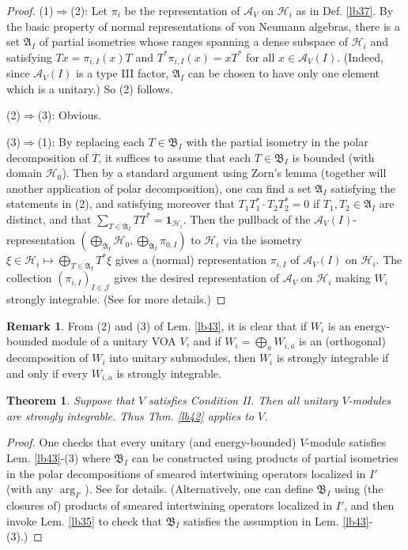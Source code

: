 \documentclass[11pt,b5paper,notitlepage]{article}
\theoremstyle{definition}
\newtheorem{rem}[df]{Remark}
\theoremstyle{plain}
\newtheorem{thm}[df]{Theorem}
\newcommand{\fk}{\mathfrak}
\newcommand{\mc}{\mathcal}
\newcommand{\ovl}{\overline}
\newcommand{\idt}{\mathbf{1}}
\numberwithin{equation}{section}
\begin{document}
\begin{proof}
(1)$\Rightarrow$(2): Let $\pi_i$ be the representation of $\mc A_V$ on $\mc H_i$ as in Def. \ref{lb37}. By the basic property of normal representations of von Neumann algebras, there is a set $\fk A_I$ of partial isometries whose ranges spanning a dense subspace of $\mc H_i$ and satisfying $Tx=\pi_{i,I}(x)T$ and $T^*\pi_{i,I}(x)=xT^*$ for all $x\in\mc A_V(I)$. (Indeed, since $\mc A_V(I)$ is a type III factor, $\fk A_I$ can be chosen to have only one element which is a unitary.) So (2) follows.

(2)$\Rightarrow$(3): Obvious.

(3)$\Rightarrow$(1): By replacing each $T\in\fk B_I$ with the partial isometry in the polar decomposition of $\ovl T$, it suffices to assume that each $T\in\fk B_I$ is bounded (with domain $\mc H_0$). Then by a standard argument using Zorn's lemma (together will another application of polar decomposition), one can find a set $\fk A_I$ satisfying the statements in (2), and satisfying moreover that $T_1T_1^*\cdot T_2T_2^*=0$ if $T_1,T_2\in\fk A_I$ are distinct, and that $\sum_{T\in\fk A_I}TT^*=\idt_{\mc H_i}$. Then the pullback of the $\mc A_V(I)$-representation $(\bigoplus_{\fk A_I}\mc H_0,\bigoplus_{\fk A_I}\pi_{0,I})$ to $\mc H_i$  via the isometry $\xi\in\mc H_i\mapsto \bigoplus_{T\in\fk A_I}T^*\xi$ gives a (normal) representation $\pi_{i,I}$ of $\mc A_V(I)$ on $\mc H_i$. The collection $(\pi_{i,I})_{I\in\mc J}$ gives the desired representation of $\mc A_V$ on $\mc H_i$ making $W_i$ strongly integrable. (See \cite[Prop. 4.7]{Gui19b} for more details.)
\end{proof}



\begin{rem}
From (2) and (3) of Lem. \ref{lb43}, it is clear that if $W_i$ is an energy-bounded module of a unitary VOA $V$, and if $W_i=\bigoplus_a W_{i,a}$ is an (orthogonal) decomposition of $W_i$ into unitary submodules, then $W_i$ is strongly integrable if and only if every $W_{i,a}$ is strongly integrable.
\end{rem}





\begin{thm}\label{lb48}
Suppose that $V$ satisfies Condition II. Then all unitary $V$-modules are strongly integrable. Thus Thm. \ref{lb42} applies to $V$. 
\end{thm}

\begin{proof}
One checks that every unitary (and energy-bounded) $V$-module satisfies Lem. \ref{lb43}-(3) where $\fk B_I$ can be constructed using products of partial isometries in the polar decompositions of smeared intertwining operators localized in $I'$ (with any $\arg_{I'}$). See \cite[Thm. 2.4.2]{Gui20} for details. (Alternatively, one can define $\fk B_I$ using (the closures of) products of smeared intertwining operators localized in $I'$, and then invoke Lem. \ref{lb35} to check that $\fk B_I$ satisfies the assumption in Lem. \ref{lb43}-(3).)
\end{proof}
\end{document}
